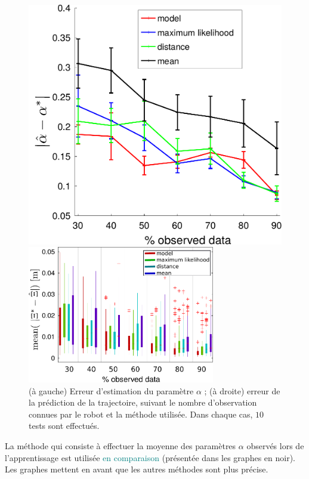 \documentclass[utf8]{frontiersSCNS} %
\newcommand{\toimprove}[1]{\textcolor{teal}{#1}}
\begin{document}
\begin{figure}[h]
 \begin{minipage}[c]{.46\linewidth}
\includegraphics[width=\hsize]{img/alphaErrorAll.pdf}
\end{minipage} \hfill
  \begin{minipage}[c]{.46\linewidth}
\includegraphics[height=6cm]{img/errorBoxplot.pdf}
\end{minipage}
\caption{(à gauche) Erreur d'estimation du paramètre $\alpha$  ; (à droite) erreur de la prédiction de la trajectoire, suivant le nombre d'observation connues par le robot et la méthode utilisée. Dans chaque cas, $10$ tests sont effectués.}
\label{fig:analyseAlpha}
\end{figure}
La méthode qui consiste à effectuer la moyenne des paramètres $\alpha$ observés lors de l'apprentissage est utilisée \toimprove{en comparaison} (présentée dans les graphes en noir). Les graphes mettent en avant que les autres méthodes sont plus précise. 
\end{document}
